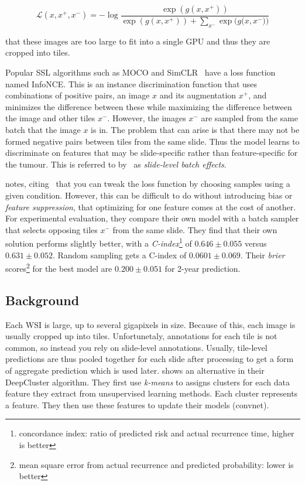 \documentclass[10pt,twocolumn,letterpaper]{article}
\begin{document}

$$ \mathcal{L}(x, x^{+}, x^{-}) = -\log{\frac{\exp(g(x,x^{+}))}{\exp(g(x,x^{+})) + \sum\limits_{x^{-}}{\exp(g(x,x^{-}}))}}$$

that these images are too large to fit into a single \gls{GPU} and thus they are cropped into tiles.  

Popular \gls{SSL} algorithms such as \gls{MOCO} and SimCLR~\cite{simCLR} have a loss function named \gls{InfoNCE}. This is an instance discrimination function that uses combinations of positive pairs, an image $x$ and its augmentation $x^{+}$, and minimizes the difference between these while maximizing the difference between the image and other tiles $x^{-}$. However, the images $x^{-}$ are sampled from the same batch that the image $x$ is in. The problem that can arise is that there may not be formed negative pairs between tiles from the same slide. Thus the model learns to discriminate on features that may be slide-specific rather than feature-specific for the tumour. This is referred to by~\cite{sslUMAP} as \textit{slide-level batch effects}.

\cite{sslUMAP} notes, citing~\cite{contrastiveShortcut} that you can tweak the loss function by choosing samples using a given condition. However, this can be difficult to do without introducing bias or \textit{feature suppression}, that optimizing for one feature comes at the cost of another. For experimental evaluation, they compare their own model with a batch sampler that selects opposing tiles $x^{-}$ from the same slide. They find that their own solution performs slightly better, with a \textit{C-index}\footnote{concordance index: ratio of predicted risk and actual recurrence time, higher is better} of $0.646 \pm 0.055$ versus $0.631 \pm 0.052$. Random sampling gets a C-index of $0.0601 \pm 0.069$. Their \textit{brier} scores\footnote{mean square error from actual recurrence and predicted probability: lower is better} for the best model are $0.200 \pm 0.051$ for 2-year prediction.

\subsection{Background}
Each \gls{WSI} is large, up to several gigapixels in size. Because of this, each image is usually cropped up into tiles. Unfortunetaly, annotations for each tile is not common, so instead you rely on slide-level annotations. Usually, tile-level predictions are thus pooled together for each slide after processing to get a form of aggregate prediction which is used later. \cite{unsupervisedClustering} shows an alternative in their DeepCluster algorithm. They first use \textit{k-means} to assigns clusters for each data feature they extract from unsupervised learning methods. Each cluster represents a feature. They then use these features to update their models (convnet). 
\end{document}
